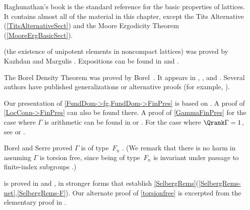 \begin{notes}

Raghunathan's book \cite{RaghunathanBook} is the standard
reference for the basic properties of lattices. It contains
almost all of the material in this chapter, except the Tits
Alternative (\cref{TitsAlternativeSect}) and the Moore Ergodicity Theorem (\cref{MooreErgBasicSect}).

 
 (the existence of unipotent elements in noncompact lattices) was proved by Kazhdan and Margulis \cite{KazhdanMargulis-PfSelberg}. Expositions can be found in \cite{Borel-KazhdanMargulisBourbaki} and \cite[Cor.~11.13, p.~180]{RaghunathanBook}. 

The Borel Density Theorem  was proved by
Borel~\cite{Borel-BDT}. It appears in
\cite[Thm.~2.4.4, p.~93]{MargulisBook}, \cite[Thm.~5.5, p.~79]{RaghunathanBook}, and
\cite[Thm.~3.2.5, pp.~41--42]{ZimmerBook}. Several authors have published
generalizations or alternative proofs
(for example, \cite{Dani-BDT, Furstenberg-BDT,
Wigner-BDT}).

Our presentation of \cref{FundDom->fg,FundDom->FinPres} is based on
\cite[pp.~195--199]{PlatonovRapinchukBook}. A proof of
\cref{LocConn->FinPres} can also be found there.
A proof of \cref{GammaFinPres} for the case where
$\Gamma$ is arithmetic can be found in
\cite{Borel-IntroGrpArith} or \cite[Thm.~4.2,
p.~195]{PlatonovRapinchukBook}. For the case where $\Qrank
\Gamma = 1$, see \cite{GarlandRaghunathan} or
\cite[Cor.~13.20, p.~210]{RaghunathanBook}.

Borel and Serre \cite[\S11.1]{BorelSerre-corners} proved $\Gamma$ is of type~$F_n$ .
(We remark that there is no harm in assuming $\Gamma$ is torsion free, since being of type~$F_n$ is invariant under passage to finite-index subgroups \cite[Cor.~7.2.4, p.~170]{Geoghegan-TopMethGrpThy}.)

is proved in \cite[Thm.~6.11, p.~93]{RaghunathanBook} and
\cite[Cor.~17.7, p.~119]{Borel-IntroGrpArith}, in stronger forms that establish \cref{SelbergRems}(\ref{SelbergRems-net},\ref{SelbergRems-F}).
Our alternate proof of
\cref{torsionfree} is excerpted from the elementary
proof in \cite{Alperin-SelbergLemma}.


\end{notes}
